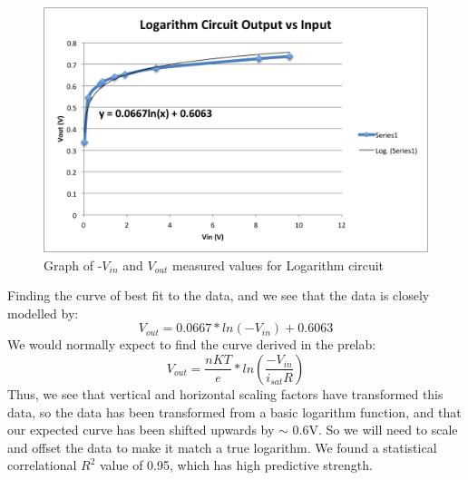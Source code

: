 \documentclass{article}
\begin{document}
    \begin{figure}[H]
        \centering
        \includegraphics[scale = 0.7]{6a.png}
        \caption{Graph of -$V_{in}$ and $V_{out}$ measured values for Logarithm circuit}
        \label{fig:my_label}
    \end{figure}
    Finding the curve of best fit to the data, and we see that the data is closely modelled by:
    \begin{equation}
        V_{out} = 0.0667 * ln(-V_{in}) + 0.6063
    \end{equation}
    We would normally expect to find the curve derived in the prelab:
    \begin{equation}
        V_{out} = \frac{nKT}{e} * ln(\frac{-V_{in}}{i_{sat} R})
    \end{equation}
    Thus, we see that vertical and horizontal scaling factors have transformed this data, so the data has been transformed from a basic logarithm function, and that our expected curve has been shifted upwards by $\sim$ 0.6V. So we will need to scale and offset the data to make it match a true logarithm. We found a statistical correlational $R^{2}$ value of 0.95, which has high predictive strength.
    
\end{document}
